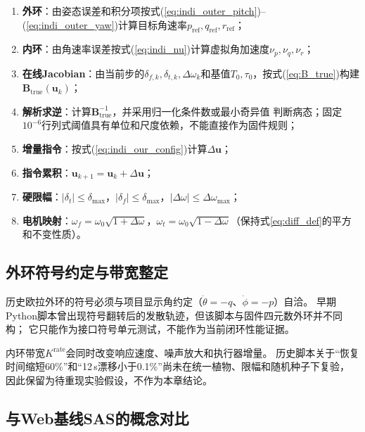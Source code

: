 \begin{enumerate}[label=(\arabic*)]
    \item \textbf{外环}：由姿态误差和积分项按式(\ref{eq:indi_outer_pitch})--(\ref{eq:indi_outer_yaw})计算目标角速率$p_{\text{ref}},q_{\text{ref}},r_{\text{ref}}$；
    \item \textbf{内环}：由角速率误差按式(\ref{eq:indi_nu})计算虚拟角加速度$\nu_p,\nu_q,\nu_r$；
    \item \textbf{在线Jacobian}：由当前步的$\delta_{f,k},\delta_{t,k},\Delta\omega_k$和基值$T_0,\tau_0$，按式(\ref{eq:B_true})构建$\mathbf{B}_{\mathrm{true}}(\mathbf{u}_k)$；
    \item \textbf{解析求逆}：计算$\mathbf{B}_{\mathrm{true}}^{-1}$，并采用归一化条件数或最小奇异值
          判断病态；固定$10^{-6}$行列式阈值具有单位和尺度依赖，不能直接作为固件规则；
    \item \textbf{增量指令}：按式(\ref{eq:indi_our_config})计算$\Delta\mathbf{u}$；
    \item \textbf{指令累积}：$\mathbf{u}_{k+1} = \mathbf{u}_k + \Delta\mathbf{u}$；
    \item \textbf{硬限幅}：$|\delta_t|\leq\delta_{\max}$，$|\delta_f|\leq\delta_{\max}$，$|\Delta\omega|\leq\Delta\omega_{\max}$；
    \item \textbf{电机映射}：$\omega_f=\omega_0\sqrt{1+\Delta\omega}$，$\omega_t=\omega_0\sqrt{1-\Delta\omega}$（保持式\ref{eq:diff_def}的平方和不变性质）。
\end{enumerate}

\subsection{外环符号约定与带宽整定}
\label{sec:indi_outer_sign}

历史欧拉外环的符号必须与项目显示角约定（$\dot\theta=-q$、$\dot\phi=-p$）自洽。
早期Python脚本曾出现符号翻转后的发散轨迹，但该脚本与固件四元数外环并不同构；
它只能作为接口符号单元测试，不能作为当前闭环性能证据。

内环带宽$K^{\text{rate}}$会同时改变响应速度、噪声放大和执行器增量。
历史脚本关于“恢复时间缩短60\%”和“12\,s漂移小于0.1\%”尚未在统一植物、限幅和随机种子下复验，
因此保留为待重现实验假设，不作为本章结论。

\subsection{与Web基线SAS的概念对比}

